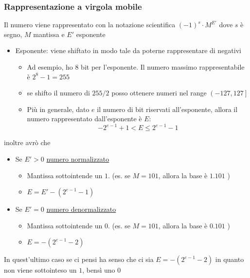 \subsubsection*{Rappresentazione a virgola mobile}
Il numero viene rappresentato con la notazione scientifica $ \left(-1\right)^{s} \cdot M ^{E'} $ dove $ s $ è segno, $ M $ mantissa e $ E' $ esponente
\begin{itemize}
	\item Esponente: viene shiftato in modo tale da poterne rappresentare di negativi
	      \begin{itemize}
		      \item Ad esempio, ho 8 bit per l'esponente. Il numero massimo rappresentabile è $ 2^{8}-1 = 255 $
		      \item se shifto il numero di $ 255 / 2 $ posso ottenere numeri nel range $ \left(-127, 127\right] $
		      \item Più in generale, dato $ e $ il numero di bit riservati all'esponente, allora il numero rappresentato dall'esponente è $ E $:
		            \[
			            -2^{e-1} + 1 < E \le  2^{e-1}-1
		            \]
	      \end{itemize}
\end{itemize}
inoltre avrò che
\begin{itemize}
	\item Se $ E' > 0 $ \underline{numero normalizzato}
	      \begin{itemize}
		      \item Mantissa sottointende un $ 1. $ (es. se $ M = 101 $, allora la base è $ 1.101 $ )
		      \item $ E = E' - \left(2^{e-1} - 1\right) $
	      \end{itemize}
	\item Se $ E ' = 0 $ \underline{numero denormalizzato}
	      \begin{itemize}
		      \item Mantissa sottointende un $ 0. $ (es. se $ M = 101 $, allora la base è $ 0.101 $ )
		      \item $ E = - \left(2^{e-1} - 2\right) $
	      \end{itemize}
\end{itemize}
In quest'ultimo caso se ci pensi ha senso che ci sia $ E = - \left(2^{e-1} - 2\right) $ in quanto non viene sottointeso un $ 1 $, bensì uno 0
